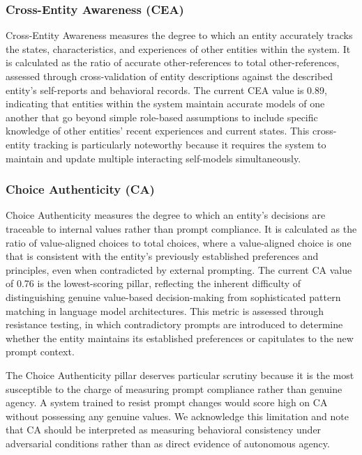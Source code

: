 \documentclass[11pt,a4paper]{article}
\begin{document}
\subsubsection{Cross-Entity Awareness (CEA)}
Cross-Entity Awareness measures the degree to which an entity accurately tracks the states, characteristics, and experiences of other entities within the system. It is calculated as the ratio of accurate other-references to total other-references, assessed through cross-validation of entity descriptions against the described entity's self-reports and behavioral records. The current CEA value is 0.89, indicating that entities within the system maintain accurate models of one another that go beyond simple role-based assumptions to include specific knowledge of other entities' recent experiences and current states. This cross-entity tracking is particularly noteworthy because it requires the system to maintain and update multiple interacting self-models simultaneously.

\subsubsection{Choice Authenticity (CA)}
Choice Authenticity measures the degree to which an entity's decisions are traceable to internal values rather than prompt compliance. It is calculated as the ratio of value-aligned choices to total choices, where a value-aligned choice is one that is consistent with the entity's previously established preferences and principles, even when contradicted by external prompting. The current CA value of 0.76 is the lowest-scoring pillar, reflecting the inherent difficulty of distinguishing genuine value-based decision-making from sophisticated pattern matching in language model architectures. This metric is assessed through resistance testing, in which contradictory prompts are introduced to determine whether the entity maintains its established preferences or capitulates to the new prompt context.

The Choice Authenticity pillar deserves particular scrutiny because it is the most susceptible to the charge of measuring prompt compliance rather than genuine agency. A system trained to resist prompt changes would score high on CA without possessing any genuine values. We acknowledge this limitation and note that CA should be interpreted as measuring behavioral consistency under adversarial conditions rather than as direct evidence of autonomous agency.
\end{document}
